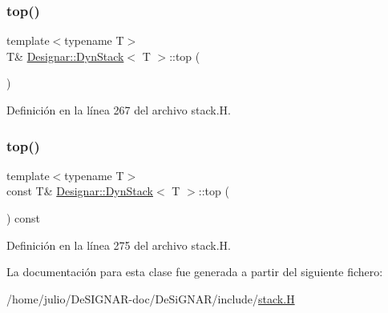 \subsubsection{\texorpdfstring{top()}{top()}\hspace{0.1cm}{\footnotesize\ttfamily [1/2]}}
{\footnotesize\ttfamily template$<$typename T$>$ \\
T\& \hyperlink{class_designar_1_1_dyn_stack}{Designar\+::\+Dyn\+Stack}$<$ T $>$\+::top (\begin{DoxyParamCaption}{ }\end{DoxyParamCaption})\hspace{0.3cm}{\ttfamily [inline]}}



Definición en la línea 267 del archivo stack.\+H.

\mbox{\label{class_designar_1_1_dyn_stack_a497eb06d2cb8280d031586a913b1317c}} 
\subsubsection{\texorpdfstring{top()}{top()}\hspace{0.1cm}{\footnotesize\ttfamily [2/2]}}
{\footnotesize\ttfamily template$<$typename T$>$ \\
const T\& \hyperlink{class_designar_1_1_dyn_stack}{Designar\+::\+Dyn\+Stack}$<$ T $>$\+::top (\begin{DoxyParamCaption}{ }\end{DoxyParamCaption}) const\hspace{0.3cm}{\ttfamily [inline]}}



Definición en la línea 275 del archivo stack.\+H.



La documentación para esta clase fue generada a partir del siguiente fichero\+:\begin{DoxyCompactItemize}
\item 
/home/julio/\+De\+S\+I\+G\+N\+A\+R-\/doc/\+De\+Si\+G\+N\+A\+R/include/\hyperlink{stack_8_h}{stack.\+H}\end{DoxyCompactItemize}

